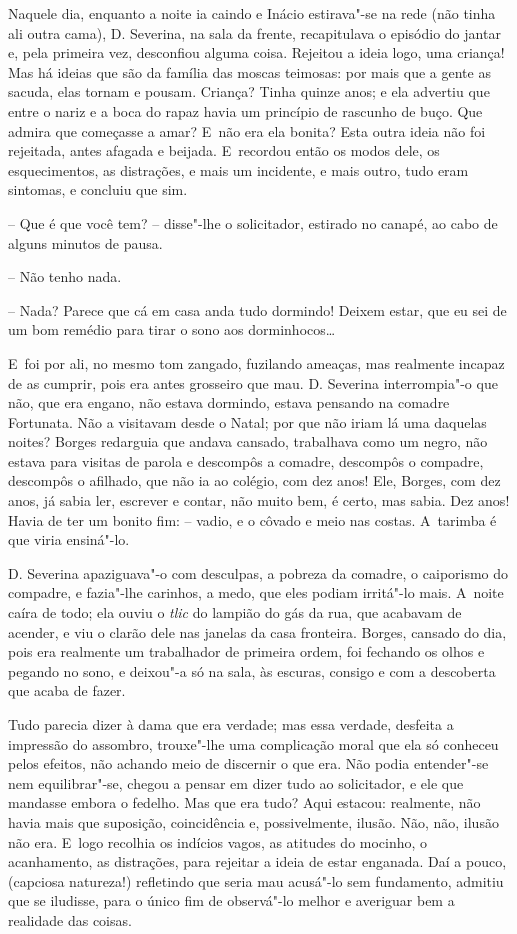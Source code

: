Naquele dia, enquanto a noite ia caindo e Inácio estirava"-se na rede
(não tinha ali outra cama), D. Severina, na sala da frente, recapitulava
o episódio do jantar e, pela primeira vez, desconfiou alguma coisa.
Rejeitou a ideia logo, uma criança! Mas há ideias que são da família das
moscas teimosas: por mais que a gente as sacuda, elas tornam e pousam.
Criança? Tinha quinze anos; e ela advertiu que entre o nariz e a boca do
rapaz havia um princípio de rascunho de buço. Que admira que começasse a
amar? E~não era ela bonita? Esta outra ideia não foi rejeitada, antes
afagada e beijada. E~recordou então os modos dele, os esquecimentos, as
distrações, e mais um incidente, e mais outro, tudo eram sintomas, e
concluiu que sim.

-- Que é que você tem? -- disse"-lhe o solicitador, estirado no canapé,
ao cabo de alguns minutos de pausa.

-- Não tenho nada.

-- Nada? Parece que cá em casa anda tudo dormindo! Deixem estar, que eu
sei de um bom remédio para tirar o sono aos dorminhocos\ldots{}

E~foi por ali, no mesmo tom zangado, fuzilando ameaças, mas realmente
incapaz de as cumprir, pois era antes grosseiro que mau. D. Severina
interrompia"-o que não, que era engano, não estava dormindo, estava
pensando na comadre Fortunata. Não a visitavam desde o Natal; por que
não iriam lá uma daquelas noites? Borges redarguia que andava cansado,
trabalhava como um negro, não estava para visitas de parola e descompôs
a comadre, descompôs o compadre, descompôs o afilhado, que não ia ao
colégio, com dez anos! Ele, Borges, com dez anos, já sabia ler, escrever
e contar, não muito bem, é certo, mas sabia. Dez anos! Havia de ter um
bonito fim: -- vadio, e o côvado e meio nas costas. A~tarimba é que
viria ensiná"-lo.

D. Severina apaziguava"-o com desculpas, a pobreza da comadre, o
caiporismo do compadre, e fazia"-lhe carinhos, a medo, que eles podiam
irritá"-lo mais. A~noite caíra de todo; ela ouviu o \emph{tlic} do
lampião do gás da rua, que acabavam de acender, e viu o clarão dele nas
janelas da casa fronteira. Borges, cansado do dia, pois era realmente um
trabalhador de primeira ordem, foi fechando os olhos e pegando no sono,
e deixou"-a só na sala, às escuras, consigo e com a descoberta que acaba
de fazer.

Tudo parecia dizer à dama que era verdade; mas essa verdade, desfeita a
impressão do assombro, trouxe"-lhe uma complicação moral que ela só
conheceu pelos efeitos, não achando meio de discernir o que era. Não
podia entender"-se nem equilibrar"-se, chegou a pensar em dizer tudo ao
solicitador, e ele que mandasse embora o fedelho. Mas que era tudo? Aqui
estacou: realmente, não havia mais que suposição, coincidência e,
possivelmente, ilusão. Não, não, ilusão não era. E~logo recolhia os
indícios vagos, as atitudes do mocinho, o acanhamento, as distrações,
para rejeitar a ideia de estar enganada. Daí a pouco, (capciosa
natureza!) refletindo que seria mau acusá"-lo sem fundamento, admitiu que
se iludisse, para o único fim de observá"-lo melhor e averiguar bem a
realidade das coisas.


